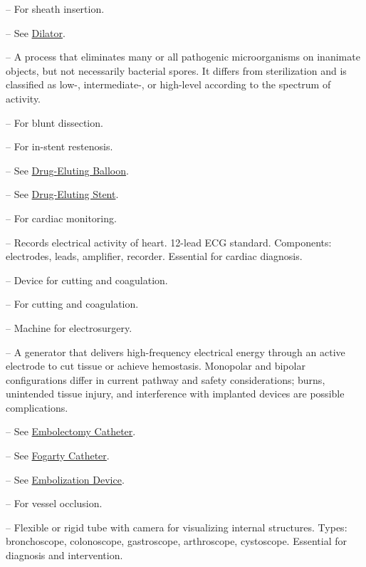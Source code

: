-- For sheath insertion.

-- See \hyperlink{Dilator}{Dilator}.

-- A process that eliminates many or all pathogenic microorganisms on inanimate objects, but not necessarily bacterial spores. It differs from sterilization and is classified as low-, intermediate-, or high-level according to the spectrum of activity.

-- For blunt dissection.

-- For in-stent restenosis.

-- See \hyperlink{Drug-Eluting Balloon}{Drug-Eluting Balloon}.

-- See \hyperlink{Drug-Eluting Stent}{Drug-Eluting Stent}.

-- For cardiac monitoring.

-- Records electrical activity of heart. 12-lead ECG standard. Components: electrodes, leads, amplifier, recorder. Essential for cardiac diagnosis.

-- Device for cutting and coagulation.

-- For cutting and coagulation.

-- Machine for electrosurgery.

-- A generator that delivers high-frequency electrical energy through an active electrode to cut tissue or achieve hemostasis. Monopolar and bipolar configurations differ in current pathway and safety considerations; burns, unintended tissue injury, and interference with implanted devices are possible complications.

-- See \hyperlink{Embolectomy Catheter}{Embolectomy Catheter}.

-- See \hyperlink{Fogarty Catheter}{Fogarty Catheter}.

-- See \hyperlink{Embolization Device}{Embolization Device}.

-- For vessel occlusion.

-- Flexible or rigid tube with camera for visualizing internal structures. Types: bronchoscope, colonoscope, gastroscope, arthroscope, cystoscope. Essential for diagnosis and intervention.

